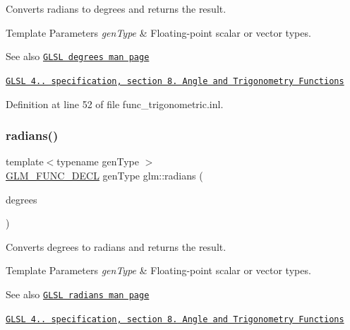 Converts radians to degrees and returns the result.


\begin{DoxyTemplParams}{Template Parameters}
{\em gen\+Type} & Floating-\/point scalar or vector types.\\
\hline
\end{DoxyTemplParams}
\begin{DoxySeeAlso}{See also}
\href{http://www.opengl.org/sdk/docs/manglsl/xhtml/degrees.xml}{\tt G\+L\+SL degrees man page} 

\href{http://www.opengl.org/registry/doc/GLSLangSpec.4.20.8.pdf}{\tt G\+L\+SL 4.. specification, section 8. Angle and Trigonometry Functions} 
\end{DoxySeeAlso}


Definition at line 52 of file func\+\_\+trigonometric.\+inl.

\mbox{\label{group__core__func__trigonometric_ga431d31cdb060059bc5b0696e212f1453}} 
\subsubsection{\texorpdfstring{radians()}{radians()}}
{\footnotesize\ttfamily template$<$typename gen\+Type $>$ \\
\hyperlink{setup_8hpp_ab2d052de21a70539923e9bcbf6e83a51}{G\+L\+M\+\_\+\+F\+U\+N\+C\+\_\+\+D\+E\+CL} gen\+Type glm\+::radians (\begin{DoxyParamCaption}\item[{gen\+Type const \&}]{degrees }\end{DoxyParamCaption})}

Converts degrees to radians and returns the result.


\begin{DoxyTemplParams}{Template Parameters}
{\em gen\+Type} & Floating-\/point scalar or vector types.\\
\hline
\end{DoxyTemplParams}
\begin{DoxySeeAlso}{See also}
\href{http://www.opengl.org/sdk/docs/manglsl/xhtml/radians.xml}{\tt G\+L\+SL radians man page} 

\href{http://www.opengl.org/registry/doc/GLSLangSpec.4.20.8.pdf}{\tt G\+L\+SL 4.. specification, section 8. Angle and Trigonometry Functions} 
\end{DoxySeeAlso}


